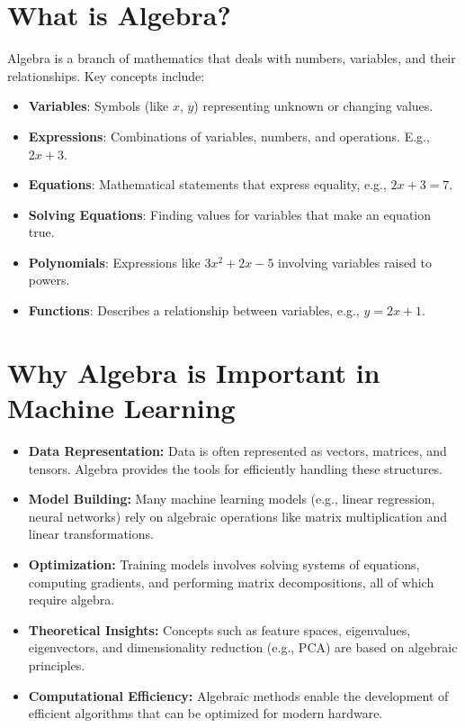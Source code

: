 \section{What is Algebra?}
Algebra is a branch of mathematics that deals with numbers, variables, and their relationships. Key concepts include:
\begin{itemize}
    \item \textbf{Variables}: Symbols (like \( x \), \( y \)) representing unknown or changing values.
    \item \textbf{Expressions}: Combinations of variables, numbers, and operations. E.g., \( 2x + 3 \).
    \item \textbf{Equations}: Mathematical statements that express equality, e.g., \( 2x + 3 = 7 \).
    \item \textbf{Solving Equations}: Finding values for variables that make an equation true.
    \item \textbf{Polynomials}: Expressions like \( 3x^2 + 2x - 5 \) involving variables raised to powers.
    \item \textbf{Functions}: Describes a relationship between variables, e.g., \( y = 2x + 1 \).
\end{itemize}

\section{Why Algebra is Important in Machine Learning}

\begin{itemize}
    \item \textbf{Data Representation:}
    Data is often represented as vectors, matrices, and tensors. Algebra provides the tools for efficiently handling these structures.
    \item \textbf{Model Building:}
    Many machine learning models (e.g., linear regression, neural networks) rely on algebraic operations like matrix multiplication and linear transformations.
    \item \textbf{Optimization:}
    Training models involves solving systems of equations, computing gradients, and performing matrix decompositions, all of which require algebra.
    \item \textbf{Theoretical Insights:}
    Concepts such as feature spaces, eigenvalues, eigenvectors, and dimensionality reduction (e.g., PCA) are based on algebraic principles.
    \item \textbf{Computational Efficiency:}
    Algebraic methods enable the development of efficient algorithms that can be optimized for modern hardware.
\end{itemize}

